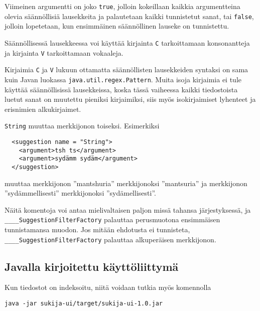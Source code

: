 \documentclass[12pt,a4paper]{scrartcl}
\begin{document}
Viimeinen argumentti on joko \verb|true|, jolloin kokeillaan kaikkia
argumentteina olevia säännöllisiä lausekkeita ja palautetaan kaikki
tunnistetut sanat, tai \verb|false|, jolloin lopetetaan, kun
ensimmäinen säännöllinen lauseke on tunnistettu.

Säännöllisessä lausekkeessa voi käyttää kirjainta \verb|C|
tarkoittamaan konsonantteja ja kirjainta \verb|V| tarkoittamaan
vokaaleja.

Kirjaimia \verb|C| ja \verb|V| lukuun ottamatta säännöllisten
lausekkeiden syntaksi on sama kuin Javan luokassa
\verb=java.util.regex.Pattern=. Muita isoja kirjaimia ei tule
käyttää säännöllisissä lausekkeissa, koska tässä vaiheessa kaikki
tiedostoista luetut sanat on muutettu pieniksi kirjaimiksi, siis myös
isokirjaimiset lyhenteet ja erisnimien alkukirjaimet.


\bigskip
\verb|String| muuttaa merkkijonon toiseksi. Esimerkiksi

\begin{verbatim}
  <suggestion name = "String">
    <argument>tsh ts</argument>
    <argument>sydämm sydäm</argument>
  </suggestion>
\end{verbatim}

muuttaa merkkijonon ''mantshuria'' merkkijonoksi ''mantsuria'' ja
merkkijonon ''sydämmellisesti'' merkkijonoksi ''sydämellisesti''.

\bigskip
Näitä komentoja voi antaa mielivaltaisen paljon missä tahansa
järjestyksessä, ja \\ \verb|____SuggestionFilterFactory| palauttaa
perusmuotona ensimmäisen tunnistamansa muodon. Jos mitään ehdotusta ei
tunnisteta, \verb|____SuggestionFilterFactory| palauttaa alkuperäisen
merkkijonon.


\subsection*{Javalla kirjoitettu käyttöliittymä}

Kun tiedostot on indeksoitu, niitä voidaan tutkia myös komennolla

\verb|java -jar sukija-ui/target/sukija-ui-1.0.jar|
\end{document}
